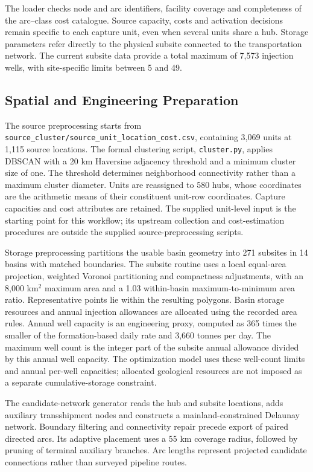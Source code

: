 \documentclass[11pt,letterpaper]{article}
\newcommand{\file}[1]{\texttt{\small\nolinkurl{#1}}}
\begin{document}
The loader checks node and arc identifiers, facility coverage and completeness of the arc--class cost catalogue. Source capacity, costs and activation decisions remain specific to each capture unit, even when several units share a hub. Storage parameters refer directly to the physical subsite connected to the transportation network. The current subsite data provide a total maximum of 7,573 injection wells, with site-specific limits between 5 and 49.

\subsection{Spatial and Engineering Preparation}

The source preprocessing starts from \file{source_cluster/source_unit_location_cost.csv}, containing 3,069 units at 1,115 source locations. The formal clustering script, \file{cluster.py}, applies DBSCAN with a 20 km Haversine adjacency threshold and a minimum cluster size of one. The threshold determines neighborhood connectivity rather than a maximum cluster diameter. Units are reassigned to 580 hubs, whose coordinates are the arithmetic means of their constituent unit-row coordinates. Capture capacities and cost attributes are retained. The supplied unit-level input is the starting point for this workflow; its upstream collection and cost-estimation procedures are outside the supplied source-preprocessing scripts.

Storage preprocessing partitions the usable basin geometry into 271 subsites in 14 basins with matched boundaries. The subsite routine uses a local equal-area projection, weighted Voronoi partitioning and compactness adjustments, with an 8,000 km$^2$ maximum area and a 1.03 within-basin maximum-to-minimum area ratio. Representative points lie within the resulting polygons. Basin storage resources and annual injection allowances are allocated using the recorded area rules. Annual well capacity is an engineering proxy, computed as 365 times the smaller of the formation-based daily rate and 3,660 tonnes per day. The maximum well count is the integer part of the subsite annual allowance divided by this annual well capacity. The optimization model uses these well-count limits and annual per-well capacities; allocated geological resources are not imposed as a separate cumulative-storage constraint.

The candidate-network generator reads the hub and subsite locations, adds auxiliary transshipment nodes and constructs a mainland-constrained Delaunay network. Boundary filtering and connectivity repair precede export of paired directed arcs. Its adaptive placement uses a 55 km coverage radius, followed by pruning of terminal auxiliary branches. Arc lengths represent projected candidate connections rather than surveyed pipeline routes.
\end{document}
